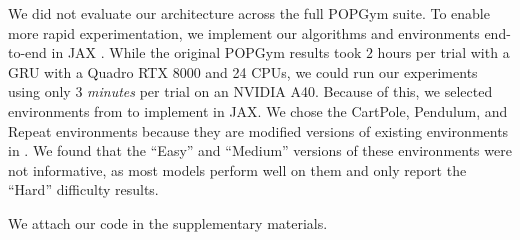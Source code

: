 \documentclass{article}
\newcommand{\newop}{\oplus}
\begin{document}
We did not evaluate our architecture across the full POPGym suite. To enable more rapid experimentation, we implement our algorithms and environments end-to-end in JAX \cite{jax2018github, lu2022discovered}. While the original POPGym results took $2$ hours per trial with a GRU with a Quadro RTX 8000 and 24 CPUs, we could run our experiments using only $3$ \textit{minutes} per trial on an NVIDIA A40. Because of this, we selected environments from \citet{morad2023popgym} to implement in JAX. We chose the CartPole, Pendulum, and Repeat environments because they are modified versions of existing environments in \citet{gymnax2022github}. We found that the ``Easy'' and ``Medium'' versions of these environments were not informative, as most models perform well on them and only report the ``Hard'' difficulty results.

We attach our code in the supplementary materials.



\end{document}
